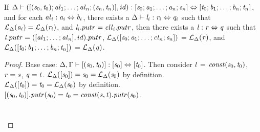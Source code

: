 \begin{lemma}
\label{lem:id-clause}
If $\Delta \vdash ([(\mathit{s}_0,\mathit{t}_0);\mathit{al}_1 ; \ldots ; \mathit{al}_n;(\mathit{s}_n,\mathit{t}_n)],id) : [\mathit{s}_0 ; \mathit{a}_1 ; \ldots ; \mathit{a}_n; \mathit{s}_n] \Leftrightarrow [\mathit{t}_0 ; \mathit{b}_1 ; \ldots ; \mathit{b}_n ; \mathit{t}_n]$,
and for each $\mathit{al}_i : \mathit{a}_i \Leftrightarrow \mathit{b}_i$,
there exists a $\Delta \vdash \mathit{l}_i : \mathit{r}_i \Leftrightarrow \mathit{q}_i$ such that
$\mathcal{L}_{\Delta}(\mathit{a}_i)=\mathcal{L}_{\Delta}(\mathit{r}_i)$, and $\mathit{l}_i.putr = \mathit{cll}_i.putr$,
then there exists a $\mathit{l} : \mathit{r} \Leftrightarrow \mathit{q}$ such that $\mathit{l}.putr = ([\mathit{al}_1 ; \ldots ; \mathit{al}_n],id).putr$, $\mathcal{L}_{\Delta}([\mathit{s}_0 ; \mathit{a}_1 ; \ldots ; \mathit{cl}_n ; \mathit{s}_n])$ = $\mathcal{L}_{\Delta}(\mathit{r})$,
and $\mathcal{L}_{\Delta}([\mathit{t}_0 ; \mathit{b}_1 ; \ldots ; \mathit{b}_n ; \mathit{t}_n])$ = $\mathcal{L}_{\Delta}(\mathit{q})$.
\begin{proof}
Base case: $\Delta, \Gamma \vdash [(\mathit{s}_0,\mathit{t}_0)] : [\mathit{s}_0] \Leftrightarrow [\mathit{t}_0]$.
Then consider $\mathit{l}$ = $\mathit{const}(\mathit{s}_0,\mathit{t}_0)$, $\mathit{r} = \mathit{s}$, $\mathit{q} = \mathit{t}$.
$\mathcal{L}_{\Delta}([\mathit{s}_0]) = \mathit{s}_0 = \mathcal{L}_{\Delta}(\mathit{s}_0)$ by definition.\\
$\mathcal{L}_{\Delta}([\mathit{t}_0]) = \mathit{t}_0 = \mathcal{L}_{\Delta}(\mathit{s}_0)$ by definition.\\
$[(\mathit{s}_0,\mathit{t}_0)]\mathit{.putr}(\mathit{s}_0)=\mathit{t}_0=\mathit{const}(\mathit{s},\mathit{t})\mathit{.putr}(\mathit{s}_0)$.
\\\\\\


\end{proof}
\end{lemma}

